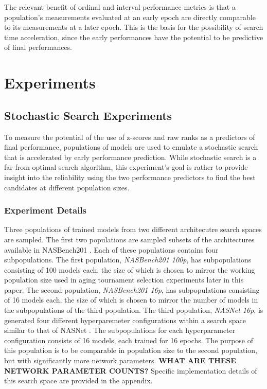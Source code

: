 \documentclass[twocolumn]{article}
\begin{document}
The relevant benefit of ordinal and interval performance metrics is that a population's measurements evaluated at an early epoch are 
directly comparable to its measurements at a later epoch. This is the basis for the possibility of search time acceleration, since
the early performances have the potential to be predictive of final performances.


\section{Experiments}

\subsection{Stochastic Search Experiments}
To measure the potential of the use of z-scores and raw ranks as a predictors of final performance, populations of models are used to
emulate a stochastic search that is accelerated by early performance prediction. 
While stochastic search is a far-from-optimal search algorithm, this experiment's goal is rather to provide insight into the reliability 
using the two performance predictors to find the best candidates at different population sizes. 

\subsubsection{Experiment Details}
Three populations of trained models from two different architecutre search spaces are sampled.
The first two populations are sampled subsets of the architectures available in NASBench201 \cite{nasbench201}.
Each of these populations contains four subpopulations.
The first population, \emph{NASBench201 100p}, has subpopulations consisting of 100 models each, the size of which is chosen to mirror the working population size 
used in aging tournament selection experiments later in this paper.
The second population, \emph{NASBench201 16p}, has subpopulations consisting of 16 models each, the size of which is chosen to mirror the number of models in the 
subpopulations of the third population.
The third population, \emph{NASNet 16p}, is generated four different hyperparemeter configurations within a search space similar to that of NASNet \cite{nasnet}.
The subpopulations for each hyperparameter configuration consists of 16 models, each trained for 16 epochs.
The purpose of this population is to be comparable in population size to the second population, but with significantly more network parameters.
\textbf{WHAT ARE THESE NETWORK PARAMETER COUNTS?}
Specific implementation details of this search space are provided in the appendix.
\end{document}
